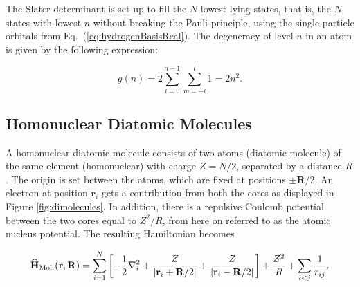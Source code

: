 The Slater determinant is set up to fill the $N$ lowest lying states, that is, the $N$ states with lowest $n$ without breaking the Pauli principle, using the single-particle orbitals from Eq.~(\ref{eq:hydrogenBasisReal}). The degeneracy of level $n$ in an atom is given by the following expression:

\begin{equation}
g(n) = 2\sum_{l=0}^{n-1}\sum_{m={-l}}^l 1 = 2n^2. 
\end{equation}

\subsection{Homonuclear Diatomic Molecules}
\label{sec:homoMolecules}

A homonuclear diatomic molecule consists of two atoms (diatomic molecule) of the same element (homonuclear) with charge $Z=N/2$, separated by a distance $R$. The origin is set between the atoms, which are fixed at positions $\pm \mathbf{R}/2$. An electron at position $\mathbf{r}_i$ gets a contribution from both the cores as displayed in Figure \ref{fig:dimolecules}. In addition, there is a repulsive Coulomb potential between the two cores equal to $Z^2/R$, from here on referred to as the atomic nucleus potential. The resulting Hamiltonian becomes

\begin{equation}
 {\bf\widehat{H}}_{\mathrm{Mol.}}(\mathbf{r}, \mathbf{R}) = \sum_{i=1}^N \left[-\frac{1}{2}\nabla_i^2 + \frac{Z}{|\mathbf{r}_i + \mathbf{R}/2|} + \frac{Z}{|\mathbf{r}_i - \mathbf{R}/2|}\right] + \frac{Z^2}{R} + \sum_{i<j} \frac{1}{r_{ij}}.
\end{equation}



